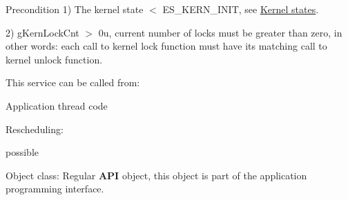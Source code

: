 \begin{DoxyPrecond}{Precondition}
1) {\ttfamily The kernel state $<$ E\-S\-\_\-\-K\-E\-R\-N\-\_\-\-I\-N\-I\-T}, see \hyperlink{states}{Kernel states}. 

2) {\ttfamily g\-Kern\-Lock\-Cnt $>$ 0u}, current number of locks must be greater than zero, in other words\-: each call to kernel lock function must have its matching call to kernel unlock function. 
\end{DoxyPrecond}
\begin{DoxyParagraph}{This service can be called from\-:}

\begin{DoxyItemize}
\item Application thread code 
\end{DoxyItemize}
\end{DoxyParagraph}
\begin{DoxyParagraph}{Rescheduling\-:}

\begin{DoxyItemize}
\item possible 
\end{DoxyItemize}
\end{DoxyParagraph}
\begin{DoxyParagraph}{Object class\-:}
Regular {\bfseries A\-P\-I} object, this object is part of the application programming interface. 
\end{DoxyParagraph}
